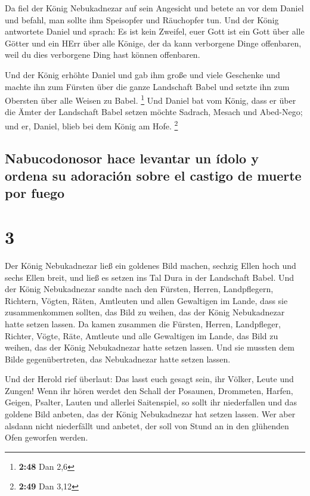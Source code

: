  Da fiel der König Nebukadnezar auf sein Angesicht und
betete an vor dem Daniel und befahl, man sollte ihm Speisopfer und
Räuchopfer tun.  Und der König antwortete Daniel und
sprach: Es ist kein Zweifel, euer Gott ist ein Gott über alle Götter und
ein HErr über alle Könige, der da kann verborgene Dinge offenbaren, weil
du dies verborgene Ding hast können offenbaren.

 Und der König erhöhte Daniel und gab ihm große und viele
Geschenke und machte ihn zum Fürsten über die ganze Landschaft Babel und
setzte ihn zum Obersten über alle Weisen zu Babel. \footnote{\textbf{2:48}
  Dan 2,6}  Und Daniel bat vom König, dass er über die
Ämter der Landschaft Babel setzen möchte Sadrach, Mesach und Abed-Nego;
und er, Daniel, blieb bei dem König am Hofe. \footnote{\textbf{2:49} Dan
  3,12}

\hypertarget{nabucodonosor-hace-levantar-un-uxeddolo-y-ordena-su-adoraciuxf3n-sobre-el-castigo-de-muerte-por-fuego}{%
\subsection{Nabucodonosor hace levantar un ídolo y ordena su adoración
sobre el castigo de muerte por
fuego}\label{nabucodonosor-hace-levantar-un-uxeddolo-y-ordena-su-adoraciuxf3n-sobre-el-castigo-de-muerte-por-fuego}}

\hypertarget{section-2}{%
\section{3}\label{section-2}}

 Der König Nebukadnezar ließ ein goldenes Bild machen,
sechzig Ellen hoch und sechs Ellen breit, und ließ es setzen ins Tal
Dura in der Landschaft Babel.  Und der König Nebukadnezar
sandte nach den Fürsten, Herren, Landpflegern, Richtern, Vögten, Räten,
Amtleuten und allen Gewaltigen im Lande, dass sie zusammenkommen
sollten, das Bild zu weihen, das der König Nebukadnezar hatte setzen
lassen.  Da kamen zusammen die Fürsten, Herren,
Landpfleger, Richter, Vögte, Räte, Amtleute und alle Gewaltigen im
Lande, das Bild zu weihen, das der König Nebukadnezar hatte setzen
lassen. Und sie mussten dem Bilde gegenübertreten, das Nebukadnezar
hatte setzen lassen.

 Und der Herold rief überlaut: Das lasst euch gesagt sein,
ihr Völker, Leute und Zungen!  Wenn ihr hören werdet den
Schall der Posaunen, Drommeten, Harfen, Geigen, Psalter, Lauten und
allerlei Saitenspiel, so sollt ihr niederfallen und das goldene Bild
anbeten, das der König Nebukadnezar hat setzen lassen. 
Wer aber alsdann nicht niederfällt und anbetet, der soll von Stund an in
den glühenden Ofen geworfen werden.

